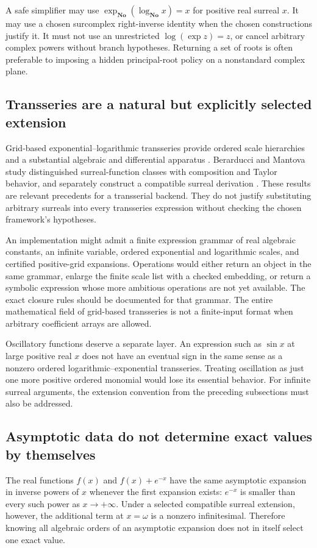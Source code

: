 \documentclass[11pt,letterpaper]{article}
\numberwithin{equation}{section}
\theoremstyle{definition}
\theoremstyle{remark}\newtheorem{remark}[theorem]{Remark}
\newcommand{\No}{\mathbf{No}}
\begin{document}
A safe simplifier may use $\exp_{\No}(\log_{\No}x)=x$ for positive real
surreal $x$. It may use a chosen surcomplex right-inverse identity when the
chosen constructions justify it. It must not use an unrestricted
$\log(\exp z)=z$, or cancel arbitrary complex powers without branch
hypotheses. Returning a set of roots is often preferable to imposing a
hidden principal-root policy on a nonstandard complex plane.

\subsection{Transseries are a natural but explicitly selected extension}
Grid-based exponential--logarithmic transseries provide ordered scale
hierarchies and a substantial algebraic and differential apparatus
\cite{vdH}. Berarducci and Mantova study distinguished surreal-function
classes with composition and Taylor behavior, and separately construct a
compatible surreal derivation \cite{BMFunctions,BMDerivations}. These results
are relevant precedents for a transserial backend. They do not justify
substituting arbitrary surreals into every transseries expression without
checking the chosen framework's hypotheses.

An implementation might admit a finite expression grammar of real algebraic
constants, an infinite variable, ordered exponential and logarithmic scales,
and certified positive-grid expansions. Operations would either return an
object in the same grammar, enlarge the finite scale list with a checked
embedding, or return a symbolic expression whose more ambitious operations
are not yet available. The exact closure rules should be documented for that
grammar. The entire mathematical field of grid-based transseries is not a
finite-input format when arbitrary coefficient arrays are allowed.

Oscillatory functions deserve a separate layer. An expression such as
$\sin x$ at large positive real $x$ does not have an eventual sign in the
same sense as a nonzero ordered logarithmic--exponential transseries.
Treating oscillation as just one more positive ordered monomial would lose
its essential behavior. For infinite surreal arguments, the extension
convention from the preceding subsections must also be addressed.

\subsection{Asymptotic data do not determine exact values by themselves}
The real functions $f(x)$ and $f(x)+e^{-x}$ have the same asymptotic expansion
in inverse powers of $x$ whenever the first expansion exists: $e^{-x}$ is
smaller than every such power as $x\to+\infty$. Under a selected compatible
surreal extension, however, the additional term at $x=\omega$ is a nonzero
infinitesimal. Therefore knowing all algebraic orders of an asymptotic
expansion does not in itself select one exact value.
\end{document}

